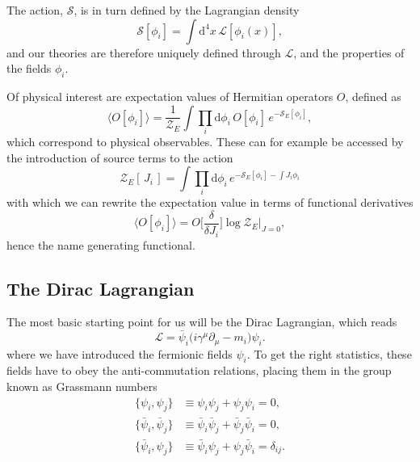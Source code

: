 The action, $\mathcal{S}$, is in turn defined by the Lagrangian density
%
\begin{equation} \label{eq:action-def}
  \mathcal{S}[\phi_i] = \int \mathrm{d}^4 x\, \mathcal{L}[\phi_i(x)],
\end{equation}
%
and our theories are therefore uniquely defined through $\mathcal{L}$, and the
properties of the fields $\phi_i$.

Of physical interest are expectation values of Hermitian operators $O$, defined
as
%
\begin{equation} \label{eq:expectation_value}
  \big\langle O[\phi_i] \big\rangle = \frac{1}{\mathcal{Z}_E} 
    \int \prod_i \mathrm{d} \phi_i \, O[\phi_i]\, e^{-\mathcal{S}_E[\phi_i]},
\end{equation}
%
which correspond to physical observables. These can for example be accessed by
the introduction of source terms to the action
%
\begin{equation}
  \mathcal{Z}_E [\,J_i\,] = \int \prod_i \mathrm{d} \phi_i \,
    e^{-\mathcal{S}_E[\phi_i] - \int J_i \phi_i}
\end{equation}
%
with which we can rewrite the expectation value in terms of functional
derivatives
%
\begin{equation}
  \big\langle O[\phi_i] \big\rangle = O\bigg[ \frac{\delta}{\delta J_i} \bigg]
    \log \mathcal{Z}_E \bigg|_{J=0},
\end{equation}
%
hence the name generating functional.

\subsection{The Dirac Lagrangian}

The most basic starting point for us will be the Dirac Lagrangian, which reads
%
\begin{equation}
  \mathcal{L} = \bar{\psi}_i \big(i\gamma^{\mu} \partial_{\mu} - m_i\big)
  \psi_i. \label{eq:ldirac}
\end{equation}
%
where we have introduced the fermionic fields $\psi_i$. To get the right
statistics, these fields have to obey the anti-commutation relations, placing
them in the group known as Grassmann numbers
%
\begin{align}
  \big\{ \psi_i, \psi_j \big\} &\equiv \psi_i \psi_j + \psi_j \psi_i = 0,\\
  \big\{ \bar{\psi}_i, \bar{\psi}_j \big\} &\equiv \bar{\psi}_i \bar{\psi}_j +
    \bar{\psi}_j \bar{\psi}_i = 0,\\
  \big\{ \bar{\psi}_i, \psi_j \big\} &\equiv \bar{\psi}_i \psi_j + \psi_j
    \bar{\psi}_i = \delta_{ij}.
\end{align}

